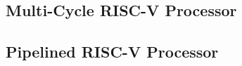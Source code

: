 \documentclass[.52pt,a4paper,titlepage]{article}
\begin{document}
\subsection{Multi-Cycle RISC-V Processor}
\begin{center}
	\resizebox*{\textwidth}{!}{
		
	}
	\resizebox*{\textwidth}{!}{
		
	}
\end{center}

\subsection{Pipelined RISC-V Processor}
\begin{center}
	\resizebox*{\textwidth}{!}{
		
	}
\end{center}
\end{document}
